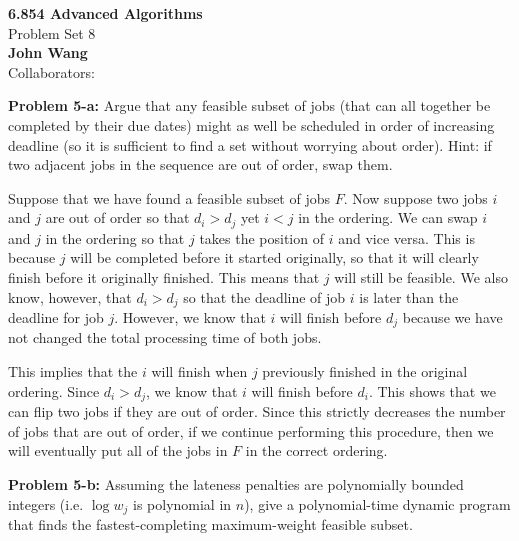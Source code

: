\documentclass[psamsfonts]{amsart}
\newenvironment{sol}{\vspace{0.25cm}{\large \bfseries Solution:}}{\qedsymbol}
\newenvironment{prob}[1]{\begin{framed}{\large \bfseries Problem #1:}}{\end{framed}}
\newcommand{\makenewtitle}{
    \begin{center}
    {\huge \bfseries 6.854 Advanced Algorithms} \\
    Problem Set 8\\
    \vspace{0.25cm}
    {\bfseries John Wang} \\
    Collaborators:  
    \end{center}
    \vspace{0.5cm}
}
\begin{document}
\newpage
\makenewtitle

\begin{prob}{5-a}
Argue that any feasible subset of jobs (that can all together be completed by their due dates) might as well be scheduled in order of increasing deadline (so it is sufficient to find a set without worrying about order). Hint: if two adjacent jobs in the sequence are out of order, swap them. 
\end{prob}
\begin{sol}
Suppose that we have found a feasible subset of jobs $F$. Now suppose two jobs $i$ and $j$ are out of order so that $d_i > d_j$ yet $i < j$ in the ordering. We can swap $i$ and $j$ in the ordering so that $j$ takes the position of $i$ and vice versa. This is because $j$ will be completed before it started originally, so that it will clearly finish before it originally finished. This means that $j$ will still be feasible. We also know, however, that $d_i > d_j$ so that the deadline of job $i$ is later than the deadline for job $j$. However, we know that $i$ will finish before $d_j$ because we have not changed the total processing time of both jobs. 

This implies that the $i$ will finish when $j$ previously finished in the original ordering. Since $d_i > d_j$, we know that $i$ will finish before $d_i$. This shows that we can flip two jobs if they are out of order. Since this strictly decreases the number of jobs that are out of order, if we continue performing this procedure, then we will eventually put all of the jobs in $F$ in the correct ordering. 
\end{sol}

\begin{prob}{5-b}
Assuming the lateness penalties are polynomially bounded integers (i.e. $\log w_j$ is polynomial in $n$), give a polynomial-time dynamic program that finds the fastest-completing maximum-weight feasible subset. 
\end{prob}
\begin{sol}

\end{sol}
\end{document}
